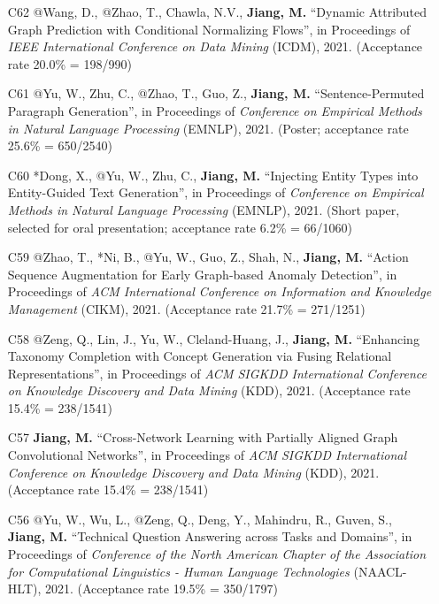 \documentclass[10pt]{article}
\newenvironment{myindentpar}[1]%
{\begin{list}{}%
         {\setlength{\leftmargin}{#1}}%
         \item[]%
}
{\end{list}}
\newcounter{list}
\begin{document}
\begin{myindentpar}{0.00cm}
\begin{enumerate}[leftmargin=.5cm]
\item[C62] @Wang, D., @Zhao, T., Chawla, N.V., \textbf{Jiang, M.} ``Dynamic Attributed Graph Prediction with Conditional Normalizing Flows'', in Proceedings of \textit{IEEE International Conference on Data Mining} (ICDM), 2021. (Acceptance rate 20.0\% = 198/990)

\item[C61] @Yu, W., Zhu, C., @Zhao, T., Guo, Z., \textbf{Jiang, M.} ``Sentence-Permuted Paragraph Generation'', in Proceedings of \textit{Conference on Empirical Methods in Natural Language Processing} (EMNLP), 2021. (Poster; acceptance rate 25.6\% = 650/2540)

\item[C60] *Dong, X., @Yu, W., Zhu, C., \textbf{Jiang, M.} ``Injecting Entity Types into Entity-Guided Text Generation'', in Proceedings of \textit{Conference on Empirical Methods in Natural Language Processing} (EMNLP), 2021. (Short paper, selected for oral presentation; acceptance rate 6.2\% = 66/1060)

\item[C59] @Zhao, T., *Ni, B., @Yu, W., Guo, Z., Shah, N., \textbf{Jiang, M.} ``Action Sequence Augmentation for Early Graph-based Anomaly Detection'', in Proceedings of \textit{ACM International Conference on Information and Knowledge Management} (CIKM), 2021. (Acceptance rate 21.7\% = 271/1251)
		
\item[C58] @Zeng, Q., Lin, J., Yu, W., Cleland-Huang, J., \textbf{Jiang, M.} ``Enhancing Taxonomy Completion with Concept Generation via Fusing Relational Representations'', in Proceedings of \textit{ACM SIGKDD International Conference on Knowledge Discovery and Data Mining} (KDD), 2021. (Acceptance rate 15.4\% = 238/1541)

\item[C57] \textbf{Jiang, M.} ``Cross-Network Learning with Partially Aligned Graph Convolutional Networks'', in Proceedings of \textit{ACM SIGKDD International Conference on Knowledge Discovery and Data Mining} (KDD), 2021. (Acceptance rate 15.4\% = 238/1541)	

\item[C56] @Yu, W., Wu, L., @Zeng, Q., Deng, Y., Mahindru, R., Guven, S., \textbf{Jiang, M.} ``Technical Question Answering across Tasks and Domains'', in Proceedings of \textit{Conference of the North American Chapter of the Association for Computational Linguistics - Human Language Technologies} (NAACL-HLT), 2021. (Acceptance rate 19.5\% = 350/1797)


\end{enumerate}
\end{myindentpar}
\end{document}
